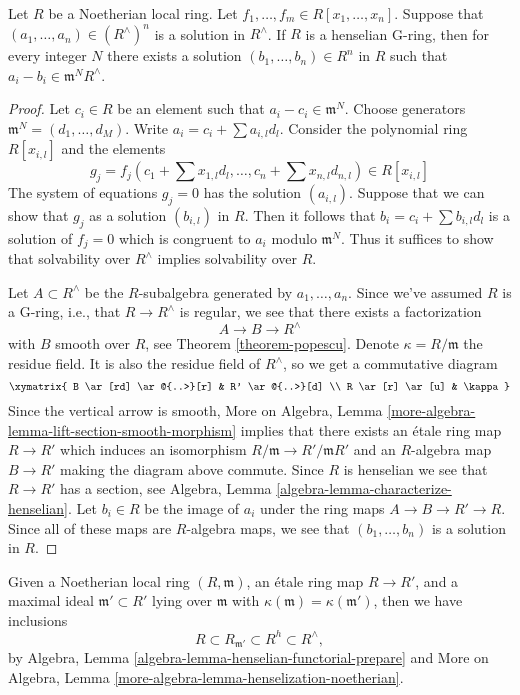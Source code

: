 \begin{theorem}
\label{theorem-approximation-property}
Let $R$ be a Noetherian local ring. Let
$f_1, \ldots, f_m \in R[x_1, \ldots, x_n]$.
Suppose that $(a_1, \ldots, a_n) \in (R^\wedge)^n$ is a solution
in $R^\wedge$. If $R$ is a henselian G-ring, then for every integer
$N$ there exists a solution $(b_1, \ldots, b_n) \in R^n$ in $R$ such that
$a_i - b_i \in \mathfrak m^NR^\wedge$.
\end{theorem}

\begin{proof}
Let $c_i \in R$ be an element such that $a_i - c_i \in \mathfrak m^N$.
Choose generators $\mathfrak m^N = (d_1, \ldots, d_M)$.
Write $a_i = c_i + \sum a_{i, l} d_l$.
Consider the polynomial ring $R[x_{i, l}]$ and the elements
$$
g_j = f_j(c_1 + \sum x_{1, l} d_l , \ldots, c_n + \sum x_{n, l} d_{n, l})
\in R[x_{i, l}]
$$
The system of equations $g_j = 0$ has the solution $(a_{i, l})$.
Suppose that we can show that $g_j$ as a solution $(b_{i, l})$ in $R$.
Then it follows that $b_i = c_i + \sum b_{i, l}d_l$ is a solution
of $f_j = 0$ which is congruent to $a_i$ modulo $\mathfrak m^N$.
Thus it suffices to show that solvability over $R^\wedge$ implies
solvability over $R$.

\medskip\noindent
Let $A \subset R^\wedge$ be the $R$-subalgebra generated by
$a_1, \ldots, a_n$. Since we've assumed $R$ is a G-ring, i.e.,
that $R \to R^\wedge$ is regular, we see that
there exists a factorization
$$
A \to B \to R^\wedge
$$
with $B$ smooth over $R$, see Theorem \ref{theorem-popescu}.
Denote $\kappa = R/\mathfrak m$ the residue field. It is also
the residue field of $R^\wedge$, so we get a commutative diagram
$$
\xymatrix{
B \ar[rd] \ar@{..>}[r] & R' \ar@{..>}[d] \\
R \ar[r] \ar[u] & \kappa
}
$$
Since the vertical arrow is smooth,
More on Algebra, Lemma \ref{more-algebra-lemma-lift-section-smooth-morphism}
implies that there exists an \'etale ring map $R \to R'$
which induces an isomorphism $R/\mathfrak m \to R'/\mathfrak mR'$
and an $R$-algebra map $B \to R'$ making the diagram above commute.
Since $R$ is henselian we see that $R \to R'$ has a section, see
Algebra, Lemma \ref{algebra-lemma-characterize-henselian}.
Let $b_i \in R$ be the image of $a_i$ under the ring maps
$A \to B \to R' \to R$. Since all of these maps are $R$-algebra
maps, we see that $(b_1, \ldots, b_n)$ is a solution in $R$.
\end{proof}

\noindent
Given a Noetherian local ring $(R, \mathfrak m)$, an \'etale
ring map $R \to R'$, and a maximal ideal $\mathfrak m' \subset R'$
lying over $\mathfrak m$ with $\kappa(\mathfrak m) = \kappa(\mathfrak m')$,
then we have inclusions
$$
R \subset R_{\mathfrak m'} \subset R^h \subset R^\wedge,
$$
by Algebra, Lemma \ref{algebra-lemma-henselian-functorial-prepare} and
More on Algebra, Lemma \ref{more-algebra-lemma-henselization-noetherian}.

